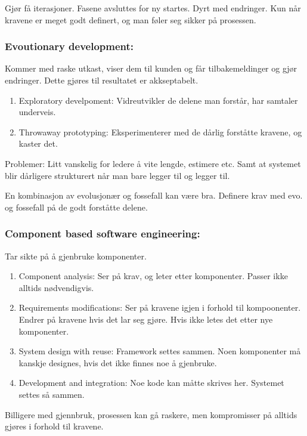 \documentclass[11pt]{article}
\begin{document}
   Gjør få iterasjoner. Fasene avsluttes for ny startes. Dyrt med endringer.
   Kun når kravene er meget godt definert, og man føler seg sikker på prosessen.
\subsubsection{Evoutionary development:}
\label{sec-4.1.2}

    Kommer med raske utkast, viser dem til kunden og får tilbakemeldinger og gjør endringer. Dette gjøres til resultatet er akkseptabelt.

\begin{enumerate}
\item Exploratory develpoment: 
       Vidreutvikler de delene man forstår, har samtaler underveis.
\item Throwaway prototyping: 
       Eksperimenterer med de dårlig forståtte kravene, og kaster det.
\end{enumerate}

    Problemer: Litt vanskelig for ledere å vite lengde, estimere etc. 
    Samt at systemet blir dårligere strukturert når man bare legger til og legger til. 

    En kombinasjon av evolusjonær og fossefall kan være bra. Definere krav med evo. og fossefall på de godt forståtte delene.
\subsubsection{Component based software engineering:}
\label{sec-4.1.3}

    Tar sikte på å gjenbruke komponenter. 
    
\begin{enumerate}
\item Component analysis: 
       Ser på krav, og leter etter komponenter. Passer ikke alltids nødvendigvis.
\item Requirements modifications: 
       Ser på kravene igjen i forhold til kompoonenter. 
       Endrer på kravene hvis det lar seg gjøre. Hvis ikke letes det etter nye komponenter.
\item System design with reuse: 
       Framework settes sammen. Noen komponenter må kanskje designes, hvis det ikke finnes noe å gjenbruke.
\item Development and integration: 
       Noe kode kan måtte skrives her. Systemet settes så sammen.
\end{enumerate}

    Billigere med gjennbruk, prosessen kan gå raskere, men kompromisser på alltids gjøres i forhold til kravene.
\end{document}
